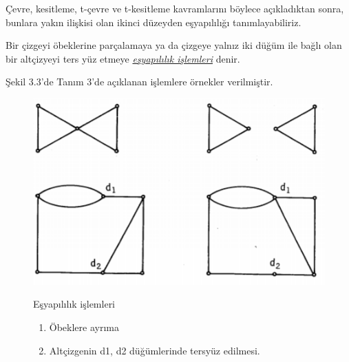 \documentclass[11pt]{amsbook}
\begin{document}
\setcounter{page}{147}
\setcounter{section}{3}
\setcounter{theorem}{2}
\setcounter{figure}{2}
\renewcommand{\theenumi}{\alph{enumi}}


Çevre, kesitleme, t-çevre ve t-kesitleme kavramlarını böylece
açıkladıktan sonra, bunlara yakın ilişkisi olan ikinci düzeyden
eşyapılılığı tanımlayabiliriz.
\begin{definition}
	Bir çizgeyi öbeklerine parçalamaya ya da çizgeye yalnız iki
	düğüm ile bağlı olan bir altçizyeyi ters yüz etmeye
	\textit{\underline{eşyapılılık işlemleri}} denir.
\end{definition}
Şekil 3.3'de Tanım 3'de açıklanan işlemlere örnekler verilmiştir.

\begin{figure}[h]
	\includegraphics[scale=1.3]{images/ceyhun-147-fig01.png}
	\begin{caption}
		\enskip Eşyapılılık işlemleri 
		\begin{enumerate}
			\item Öbeklere ayrıma
			\item Altçizgenin d1, d2 düğümlerinde tersyüz edilmesi. 
		\end{enumerate}
	\end{caption}
\end{figure}
\end{document}
